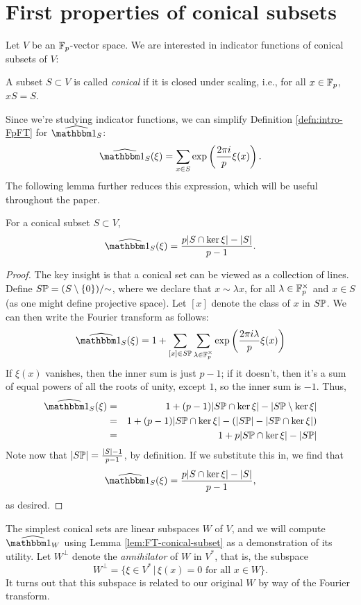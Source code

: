 \section{First properties of conical subsets}\label{sec:part0}

Let $V$ be an $\F_p$-vector space. We are interested in indicator functions of conical subsets of $V$:
\begin{defn}
    A subset $S\subset V$ is called \emph{conical} if it is closed under scaling,
    i.e., for all $x\in \F_p$, $xS = S$.    
\end{defn}
Since we're studying indicator functions, we can simplify Definition \ref{defn:intro-FpFT} for 
$\widehat{\IND_S}$:
\[ \widehat{\IND_S}(\xi) = \sum_{x\in S} \exp \left(\frac{2\pi i}{p} \xi(x)\right). \]
The following lemma further reduces this expression,
which will be useful throughout the paper.
\begin{lem}\label{lem:FT-conical-subset}
	For a conical subset $S \subset V$,
	\[ \widehat{\IND_S}(\xi) = \frac{p|S \cap \ker \xi| - |S|}{p-1}. \]
	\begin{proof}
	   The key insight is that a conical set can be viewed as a collection of lines.
	   Define $S\P = (S\setminus\{0\}) / {\sim}$, where we declare that 
	   $x \sim \lambda x$, for all $\lambda\in\F_p^\times$ and
	   $x\in S$ (as one might define projective space). Let $[x]$ denote the class
	   of $x$ in $S\P$. We can then write the Fourier transform as follows:
	   \[ \widehat{\IND_S}(\xi) = 
	           1 + \sum_{[x]\in S\P} 
	               \sum_{\lambda\in\F_p^\times} \exp \left(\frac{2\pi i \lambda}{p} \xi(x)\right) \]
	   If $\xi(x)$ vanishes, then the inner sum is just $p-1$; if it doesn't, then it's
	   a sum of equal powers of all the roots of unity, except $1$, so the inner sum is $-1$.
	   Thus,
	   \begin{eqnarray*}
	       \widehat{\IND_S}(\xi)
	       &=& 1 + 
	           (p-1)|S\P \cap \ker \xi| - 
	           |S\P \setminus \ker\xi| \\
	       &=& 1 + 
	           (p-1)|S\P \cap \ker \xi| - 
	           (|S\P| - |S\P \cap \ker\xi|) \\
	       &=& 1 + 
	           p|S\P \cap \ker \xi| - |S\P|
	   \end{eqnarray*}
	   Note now that $|S\P| = \frac{|S| - 1}{p-1}$, by definition. If we substitute
	   this in, we find that 
	   \[ \widehat{\IND_S}(\xi) = \frac{p|S \cap \ker \xi| - |S|}{p-1}, \]
	   as desired.
	\end{proof}
\end{lem}
The simplest conical sets are linear subspaces $W$ of $V$, and we will compute $\widehat{\IND_W}$ using Lemma \ref{lem:FT-conical-subset}
as a demonstration of its utility. Let $W^\perp$ denote the \emph{annihilator} of $W$ in $V^*$, that is, the
subspace
\[ W^\perp = \{ \xi \in V^* \,|\, \xi(x) = 0 \text{ for all } x \in W \}. \]
It turns out that this subspace is related to our original $W$ by way of the Fourier
transform.

